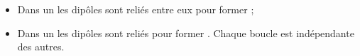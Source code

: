 \begin{mybilan}
	\begin{itemize}
		\item Dans un  les dipôles sont reliés entre eux pour former ;\pause
		
		\item Dans un  les dipôles sont reliés pour former . Chaque boucle est indépendante des autres.

	\end{itemize}
\end{mybilan}